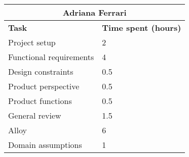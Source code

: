 \begin{table}[h]
  \center
  \begin{tabular}{l|l}
    \multicolumn{2}{c}{\textbf{Adriana Ferrari}} \\
    \hline
    \textbf{Task} & \textbf{Time spent (hours)}\\
    \hline
    Project setup & 2 \\
    Functional requirements & 4 \\
    Design constraints & 0.5 \\
    Product perspective & 0.5 \\
    Product functions & 0.5 \\
    General review & 1.5 \\
    Alloy & 6 \\
    Domain assumptions & 1 \\
  \end{tabular}
\end{table}